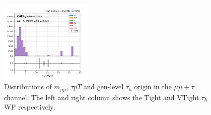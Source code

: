 \begin{figure}
    \includegraphics[width=0.4\textwidth]{appendices/jetToTauhReweighting/figures/mumutau_tauGenFlavor_pickles_lltauVTight.png}
    \caption{Distributions of $m_{\mu\mu}$, $\tau pT$ and gen-level $\tau_h$ origin in the $\mu\mu+\tau$ channel. The left and right column shows the Tight and VTight $\tau_h$ WP respectively.}
    \label{fig:appendix:fakeTauId:mumutau}
\end{figure}


